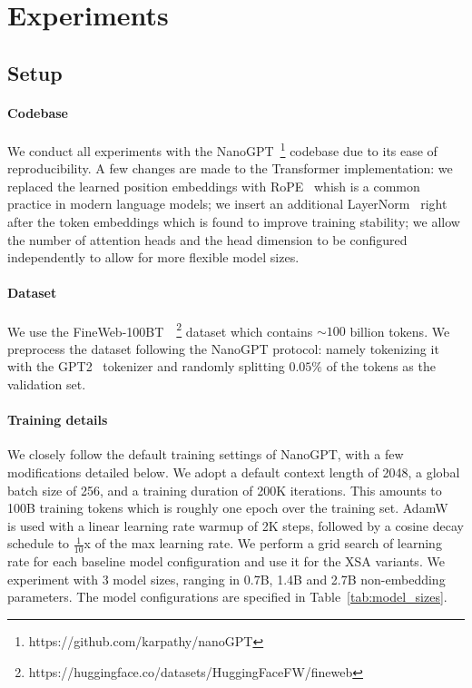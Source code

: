 \documentclass{article}
\begin{document}
\section{Experiments}
\label{sec:experiments}
\subsection{Setup}
\paragraph{Codebase} We conduct all experiments with the NanoGPT~\footnote{https://github.com/karpathy/nanoGPT} codebase due to its ease of reproducibility. A few changes are made to the Transformer implementation: we replaced the learned position embeddings with RoPE~\citep{su2023enhanced} whish is a common practice in modern language models; we insert an additional LayerNorm~\citep{ba2016layer} right after the token embeddings which is found to improve training stability; we allow the number of attention heads and the head dimension to be configured independently to allow for more flexible model sizes.

\paragraph{Dataset} We use the FineWeb-100BT~\citep{penedo2024the}~\footnote{https://huggingface.co/datasets/HuggingFaceFW/fineweb} dataset which contains $\sim 100$ billion tokens. We preprocess the dataset following the NanoGPT protocol: namely tokenizing it with the GPT2~\citep{radford2019language} tokenizer and randomly splitting $0.05\%$ of the tokens as the validation set. 

\paragraph{Training details} We closely follow the default training settings of NanoGPT, with a few modifications detailed below. We adopt a default context length of 2048, a global batch size of 256, and a training duration of 200K iterations. This amounts to 100B training tokens which is roughly one epoch over the training set. AdamW~\citep{loshchilov2017decoupled} is used with a linear learning rate warmup of 2K steps, followed by a cosine decay schedule to $\frac{1}{10}$x of the max learning rate. We perform a grid search of learning rate for each baseline model configuration and use it for the XSA variants. We experiment with 3 model sizes, ranging in 0.7B, 1.4B and 2.7B non-embedding parameters. The model configurations are specified in Table~\ref{tab:model_sizes}.
\end{document}
